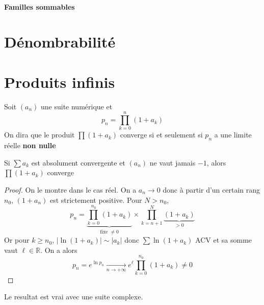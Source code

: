 \ifsolo
    ~

    \vspace{1cm}

    \begin{center}
        \textbf{\LARGE Familles sommables} \\[1em]
    \end{center}
    \tableofcontents
\else
    \minitoc
\fi
\thispagestyle{empty}

\ifsolo \newpage \setcounter{page}{1} \fi

\section{Dénombrabilité}


\section{Produits infinis}

Soit $(a_n)$ une suite numérique et \[
    p_n=\prod_{k=0}^n(1+a_k)
\]
On dira que le produit $\prod(1+a_k)$ converge si et seulement si $p_n$ a une limite réelle \textbf{non nulle}

\begin{res}
    Si $\sum a_k$ est absolument convergente et $(a_n)$ ne vaut jamais $-1$, alors $\prod(1+a_k)$ converge
\end{res}

\begin{proof}
    On le montre dans le cas réel. On a $a_n\longrightarrow 0$ donc à partir d'un certain rang $n_0$, $(1+a_n)$ est strictement positive. Pour $N>n_0$, \[
        p_n=\underbrace{\prod_{k=0}^{n_0}(1+a_k)}_{\text{fixe } \neq 0}\times \prod_{k=n+1}^{N}\underbrace{(1+a_k)}_{>0}
    \]
    Or pour $k\geq n_0$, $|\ln(1+a_k)|\sim |a_k|$ donc $\sum \ln(1+a_k)$ ACV et sa somme vaut $\ell\in\mathbb R$. On a alors \[
        p_n=e^{\ln p_n}\xrightarrow[n\to+\infty]{}e^\ell \prod_{k=0}^{n_0}(1+a_k) \neq 0
    \]
\end{proof}

\begin{rem}
    Le resultat est vrai avec une suite complexe.
\end{rem}

